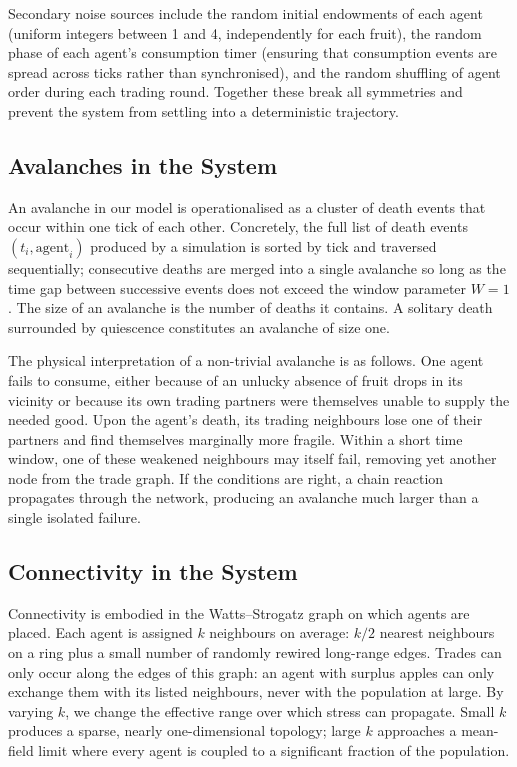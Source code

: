 \documentclass[11pt,a4paper]{article}
\begin{document}
Secondary noise sources include the random initial endowments of each agent
(uniform integers between 1 and 4, independently for each fruit), the random
phase of each agent's consumption timer (ensuring that consumption events
are spread across ticks rather than synchronised), and the random shuffling
of agent order during each trading round. Together these break all
symmetries and prevent the system from settling into a deterministic
trajectory.

\subsection{Avalanches in the System}

An avalanche in our model is operationalised as a cluster of death events
that occur within one tick of each other. Concretely, the full list of
death events $(t_i, \text{agent}_i)$ produced by a simulation is sorted by
tick and traversed sequentially; consecutive deaths are merged into a
single avalanche so long as the time gap between successive events does not
exceed the window parameter $W=1$. The size of an avalanche is the number
of deaths it contains. A solitary death surrounded by quiescence constitutes
an avalanche of size one.

The physical interpretation of a non-trivial avalanche is as follows. One
agent fails to consume, either because of an unlucky absence of fruit drops
in its vicinity or because its own trading partners were themselves unable
to supply the needed good. Upon the agent's death, its trading neighbours
lose one of their partners and find themselves marginally more fragile.
Within a short time window, one of these weakened neighbours may itself
fail, removing yet another node from the trade graph. If the conditions are
right, a chain reaction propagates through the network, producing an
avalanche much larger than a single isolated failure.

\subsection{Connectivity in the System}

Connectivity is embodied in the Watts--Strogatz graph on which agents are
placed. Each agent is assigned $k$ neighbours on average: $k/2$ nearest
neighbours on a ring plus a small number of randomly rewired long-range
edges. Trades can only occur along the edges of this graph: an agent with
surplus apples can only exchange them with its listed neighbours, never with
the population at large. By varying $k$, we change the effective range over
which stress can propagate. Small $k$ produces a sparse, nearly
one-dimensional topology; large $k$ approaches a mean-field limit where
every agent is coupled to a significant fraction of the population.
\end{document}
